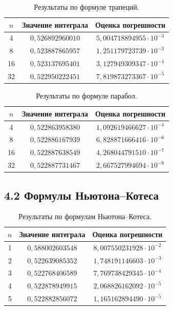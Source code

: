 \documentclass[14pt,a4paper]{extarticle}
\begin{document}
\begin{table}[H]
\centering
\caption{Результаты по формуле трапеций.}
\small
\begin{tabular}{|c|c|c|}
\hline
$n$ & Значение интеграла & Оценка погрешности \\ \hline
4 & $0{,}526892960010$ & $5{,}004718894955\cdot10^{-3}$ \\ \hline
8 & $0{,}523887865957$ & $1{,}251179723739\cdot10^{-3}$ \\ \hline
16 & $0{,}523137695401$ & $3{,}127949309347\cdot10^{-4}$ \\ \hline
32 & $0{,}522950222451$ & $7{,}819873273367\cdot10^{-5}$ \\ \hline
\end{tabular}
\end{table}

\begin{table}[H]
\centering
\caption{Результаты по формуле парабол.}
\small
\begin{tabular}{|c|c|c|}
\hline
$n$ & Значение интеграла & Оценка погрешности \\ \hline
4 & $0{,}522863958380$ & $1{,}092619466627\cdot10^{-4}$ \\ \hline
8 & $0{,}522886167939$ & $6{,}828871666416\cdot10^{-6}$ \\ \hline
16 & $0{,}522887638549$ & $4{,}268044791510\cdot10^{-7}$ \\ \hline
32 & $0{,}522887731467$ & $2{,}667527994694\cdot10^{-8}$ \\ \hline
\end{tabular}
\end{table}

\subsection*{4.2 Формулы Ньютона--Котеса}

\begin{table}[H]
\centering
\caption{Результаты по формулам Ньютона--Котеса.}
\small
\begin{tabular}{|c|c|c|}
\hline
$n$ & Значение интеграла & Оценка погрешности \\ \hline
1 & $0{,}588002603548$ & $8{,}007550231928\cdot10^{-2}$ \\ \hline
2 & $0{,}522639085352$ & $1{,}748191146603\cdot10^{-3}$ \\ \hline
3 & $0{,}522768406589$ & $7{,}769738429345\cdot10^{-4}$ \\ \hline
4 & $0{,}522878949915$ & $2{,}068826162092\cdot10^{-5}$ \\ \hline
5 & $0{,}522882856072$ & $1{,}165162894490\cdot10^{-5}$ \\ \hline
\end{tabular}
\end{table}
\end{document}
